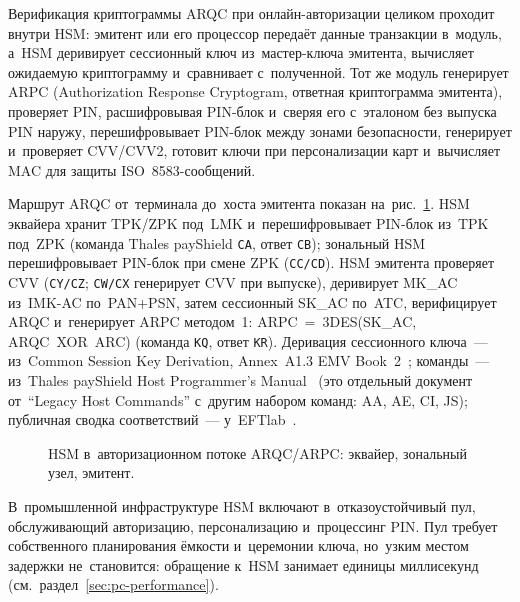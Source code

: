 Верификация криптограммы ARQC при онлайн-авторизации целиком проходит внутри HSM: эмитент или его
процессор передаёт данные транзакции в~модуль, а~HSM деривирует сессионный ключ
из~мастер-ключа эмитента, вычисляет ожидаемую криптограмму и~сравнивает
с~полученной. Тот же модуль генерирует ARPC (Authorization Response
Cryptogram, ответная криптограмма эмитента), проверяет PIN, расшифровывая PIN-блок
и~сверяя его с~эталоном без выпуска PIN наружу, перешифровывает PIN-блок между
зонами безопасности, генерирует и~проверяет CVV/CVV2, готовит ключи при
персонализации карт и~вычисляет MAC для защиты ISO~8583-сообщений.

Маршрут ARQC от~терминала до~хоста эмитента показан
на~рис.~\ref{fig:crypto-hsm-flow}. HSM эквайера хранит TPK/ZPK под~LMK
и~перешифровывает PIN-блок из~TPK под~ZPK (команда Thales payShield
\texttt{CA}, ответ \texttt{CB}); зональный HSM перешифровывает
PIN-блок при смене ZPK (\texttt{CC/CD}). HSM эмитента проверяет CVV
(\texttt{CY/CZ}; \texttt{CW/CX} генерирует CVV при выпуске), деривирует MK\_AC
из~IMK-AC по~PAN+PSN, затем сессионный SK\_AC по~ATC, верифицирует ARQC
и~генерирует ARPC методом~1: ARPC~=~3DES(SK\_AC, ARQC~XOR~ARC) (команда
\texttt{KQ}, ответ \texttt{KR}).
Деривация сессионного ключа~--- из~Common Session Key Derivation, Annex~A1.3 EMV
Book~2~\cite{emvco-book2}; команды~--- из~Thales payShield Host Programmer's
Manual~\cite{thales-payshield-host-commands} (это отдельный документ
от~\enquote{Legacy Host Commands} с~другим набором команд: AA, AE, CI, JS); публичная
сводка соответствий~--- у~EFTlab~\cite{eftlab-thales-hsm-commands}.

\begin{figure}[!ht]
  \centering
  \caption{HSM в~авторизационном потоке ARQC/ARPC: эквайер, зональный
  узел, эмитент.}%
  \label{fig:crypto-hsm-flow}
\end{figure}

В~промышленной инфраструктуре HSM включают в~отказоустойчивый пул,
обслуживающий авторизацию, персонализацию и~процессинг PIN. Пул требует собственного
планирования ёмкости и~церемонии ключа, но~узким местом задержки не~становится:
обращение к~HSM занимает единицы миллисекунд
(см.~раздел~\ref{sec:pc-performance}).



